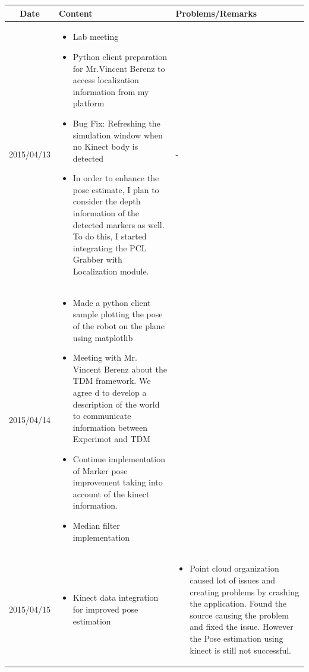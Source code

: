 \documentclass[11pt]{article} %
\begin{document}
\begin{center}
    \begin{longtable}{ | c | p{6cm} | p{5cm} |}
    \hline
    Date & Content & Problems/Remarks \\ 
    \endhead
    \hline    
     2015/04/13         & 
  \begin{itemize}
  \item Lab meeting
  \item Python client preparation for Mr.Vincent Berenz to access localization information from my platform
  \item Bug Fix: Refreshing the simulation window when no Kinect body is detected
  \item In order to enhance the pose estimate, I plan to consider the depth information of the detected markers as well. To do this, I started integrating the PCL Grabber with Localization module.
\end{itemize}  
   & - \\
\hline
  										 
 2015/04/14         & 
  \begin{itemize}
  \item Made a python client sample plotting the pose of the robot on the plane using matplotlib
  \item Meeting with Mr. Vincent Berenz about the TDM framework. We agree d to develop a description of the world to communicate information between Experimot and TDM
  \item Continue implementation of Marker pose improvement taking into account of the kinect information.
  \item Median filter implementation
\end{itemize}   
& 
 \\
\hline
  										 
  
  2015/04/15        & 
  \begin{itemize}
  \item Kinect data integration for improved pose estimation
  \end{itemize}   
  										 & 
\begin{itemize}
  \item Point cloud organization caused lot of issues and creating problems by crashing the application. Found the source causing the problem and fixed the issue. However the Pose estimation using kinect is still not successful.
  \end{itemize}  
  										 \\
  \hline
  

\end{longtable}
\end{center}
\end{document}
